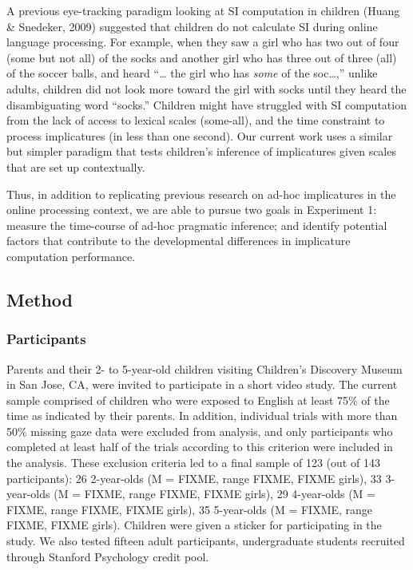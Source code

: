 \documentclass[a4paper,man,apacite,floatsintext]{apa6}
\begin{document}
A previous eye-tracking paradigm looking at SI computation in children
(Huang \& Snedeker, 2009) suggested that children do not calculate SI
during online language processing. For example, when they saw a girl who
has two out of four (some but not all) of the socks and another girl who
has three out of three (all) of the soccer balls, and heard ``\ldots{}
the girl who has \emph{some} of the soc\ldots{},'' unlike adults,
children did not look more toward the girl with socks until they heard
the disambiguating word ``socks.'' Children might have struggled with SI
computation from the lack of access to lexical scales (some-all), and
the time constraint to process implicatures (in less than one second).
Our current work uses a similar but simpler paradigm that tests
children's inference of implicatures given scales that are set up
contextually.

Thus, in addition to replicating previous research on ad-hoc
implicatures in the online processing context, we are able to pursue two
goals in Experiment 1: measure the time-course of ad-hoc pragmatic
inference; and identify potential factors that contribute to the
developmental differences in implicature computation performance.

\subsection{Method}\label{method}

\subsubsection{Participants}\label{participants}

Parents and their 2- to 5-year-old children visiting Children's
Discovery Museum in San Jose, CA, were invited to participate in a short
video study. The current sample comprised of children who were exposed
to English at least 75\% of the time as indicated by their parents. In
addition, individual trials with more than 50\% missing gaze data were
excluded from analysis, and only participants who completed at least
half of the trials according to this criterion were included in the
analysis. These exclusion criteria led to a final sample of 123 (out of
143 participants): 26 2-year-olds (M = FIXME, range FIXME, FIXME girls),
33 3-year-olds (M = FIXME, range FIXME, FIXME girls), 29 4-year-olds (M
= FIXME, range FIXME, FIXME girls), 35 5-year-olds (M = FIXME, range
FIXME, FIXME girls). Children were given a sticker for participating in
the study. We also tested fifteen adult participants, undergraduate
students recruited through Stanford Psychology credit pool.
\end{document}
